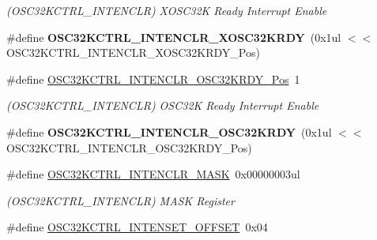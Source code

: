 \begin{DoxyCompactItemize}
\begin{DoxyCompactList}\small\item\em (O\+S\+C32\+K\+C\+T\+R\+L\+\_\+\+I\+N\+T\+E\+N\+C\+L\+R) X\+O\+S\+C32\+K Ready Interrupt Enable \end{DoxyCompactList}\item 
\hypertarget{group___s_a_m_l21___o_s_c32_k_c_t_r_l_ga9ff2e92e80971d5c85b058c13c3a72d8}{}\#define {\bfseries O\+S\+C32\+K\+C\+T\+R\+L\+\_\+\+I\+N\+T\+E\+N\+C\+L\+R\+\_\+\+X\+O\+S\+C32\+K\+R\+D\+Y}~(0x1ul $<$$<$ O\+S\+C32\+K\+C\+T\+R\+L\+\_\+\+I\+N\+T\+E\+N\+C\+L\+R\+\_\+\+X\+O\+S\+C32\+K\+R\+D\+Y\+\_\+\+Pos)\label{group___s_a_m_l21___o_s_c32_k_c_t_r_l_ga9ff2e92e80971d5c85b058c13c3a72d8}

\item 
\hypertarget{group___s_a_m_l21___o_s_c32_k_c_t_r_l_ga7f23810dd53346a10fd62fc0d98848bd}{}\#define \hyperlink{group___s_a_m_l21___o_s_c32_k_c_t_r_l_ga7f23810dd53346a10fd62fc0d98848bd}{O\+S\+C32\+K\+C\+T\+R\+L\+\_\+\+I\+N\+T\+E\+N\+C\+L\+R\+\_\+\+O\+S\+C32\+K\+R\+D\+Y\+\_\+\+Pos}~1\label{group___s_a_m_l21___o_s_c32_k_c_t_r_l_ga7f23810dd53346a10fd62fc0d98848bd}

\begin{DoxyCompactList}\small\item\em (O\+S\+C32\+K\+C\+T\+R\+L\+\_\+\+I\+N\+T\+E\+N\+C\+L\+R) O\+S\+C32\+K Ready Interrupt Enable \end{DoxyCompactList}\item 
\hypertarget{group___s_a_m_l21___o_s_c32_k_c_t_r_l_ga1224304adff5f5479fa967365fa45eb5}{}\#define {\bfseries O\+S\+C32\+K\+C\+T\+R\+L\+\_\+\+I\+N\+T\+E\+N\+C\+L\+R\+\_\+\+O\+S\+C32\+K\+R\+D\+Y}~(0x1ul $<$$<$ O\+S\+C32\+K\+C\+T\+R\+L\+\_\+\+I\+N\+T\+E\+N\+C\+L\+R\+\_\+\+O\+S\+C32\+K\+R\+D\+Y\+\_\+\+Pos)\label{group___s_a_m_l21___o_s_c32_k_c_t_r_l_ga1224304adff5f5479fa967365fa45eb5}

\item 
\hypertarget{group___s_a_m_l21___o_s_c32_k_c_t_r_l_ga753f913b2693500c8b4c878c5ed1e60a}{}\#define \hyperlink{group___s_a_m_l21___o_s_c32_k_c_t_r_l_ga753f913b2693500c8b4c878c5ed1e60a}{O\+S\+C32\+K\+C\+T\+R\+L\+\_\+\+I\+N\+T\+E\+N\+C\+L\+R\+\_\+\+M\+A\+S\+K}~0x00000003ul\label{group___s_a_m_l21___o_s_c32_k_c_t_r_l_ga753f913b2693500c8b4c878c5ed1e60a}

\begin{DoxyCompactList}\small\item\em (O\+S\+C32\+K\+C\+T\+R\+L\+\_\+\+I\+N\+T\+E\+N\+C\+L\+R) M\+A\+S\+K Register \end{DoxyCompactList}\item 
\hypertarget{group___s_a_m_l21___o_s_c32_k_c_t_r_l_gacd0c571999e2292d247edb6c3226bc6a}{}\#define \hyperlink{group___s_a_m_l21___o_s_c32_k_c_t_r_l_gacd0c571999e2292d247edb6c3226bc6a}{O\+S\+C32\+K\+C\+T\+R\+L\+\_\+\+I\+N\+T\+E\+N\+S\+E\+T\+\_\+\+O\+F\+F\+S\+E\+T}~0x04\label{group___s_a_m_l21___o_s_c32_k_c_t_r_l_gacd0c571999e2292d247edb6c3226bc6a}


\end{DoxyCompactItemize}
